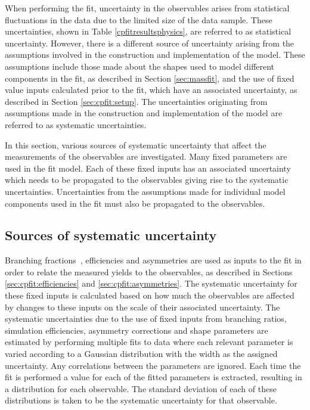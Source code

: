 When performing the \CP fit, uncertainty in the \CP observables arises from statistical fluctuations in the data due to the limited size of the data sample. These uncertainties, shown in Table \ref{cpfitresultsphysics}, are referred to as statistical uncertainty. However, there is a different source of uncertainty arising from the assumptions involved in the construction and implementation of the model. These assumptions include those made about the shapes used to model different components in the fit, as described in Section \ref{sec:massfit}, and the use of fixed value inputs calculated prior to the fit, which have an associated uncertainty, as described in Section \ref{sec:cpfit:setup}. The uncertainties originating from assumptions made in the construction and implementation of the model are referred to as systematic uncertainties.

In this section, various sources of systematic uncertainty that affect the measurements of the \CP observables are investigated. Many fixed parameters are used in the fit model. Each of these fixed inputs has an associated uncertainty which needs to be propagated to the \CP observables giving rise to the systematic uncertainties. Uncertainties from the assumptions made for individual model components used in the \CP fit must also be propagated to the \CP observables. 

\subsection{Sources of systematic uncertainty}

Branching fractions~\cite{PDG2016}, efficiencies and asymmetries are used as inputs to the \CP fit in order to relate the measured yields to the \CP observables, as described in Sections \ref{sec:cpfit:efficiencies} and \ref{sec:cpfit:asymmetries}. The systematic uncertainty for these fixed inputs is calculated based on how much the \CP observables are affected by changes to these inputs on the scale of their associated uncertainty. The systematic uncertainties due to the use of fixed inputs from branching ratios, simulation efficiencies, asymmetry corrections and shape parameters are estimated by performing multiple fits to data where each relevant parameter is varied according to a Gaussian distribution with the width as the assigned uncertainty. Any correlations between the parameters are ignored. Each time the fit is performed a value for each of the fitted parameters is extracted, resulting in a distribution for each \CP observable. The standard deviation of each of these distributions is taken to be the systematic uncertainty for that \CP observable. 

